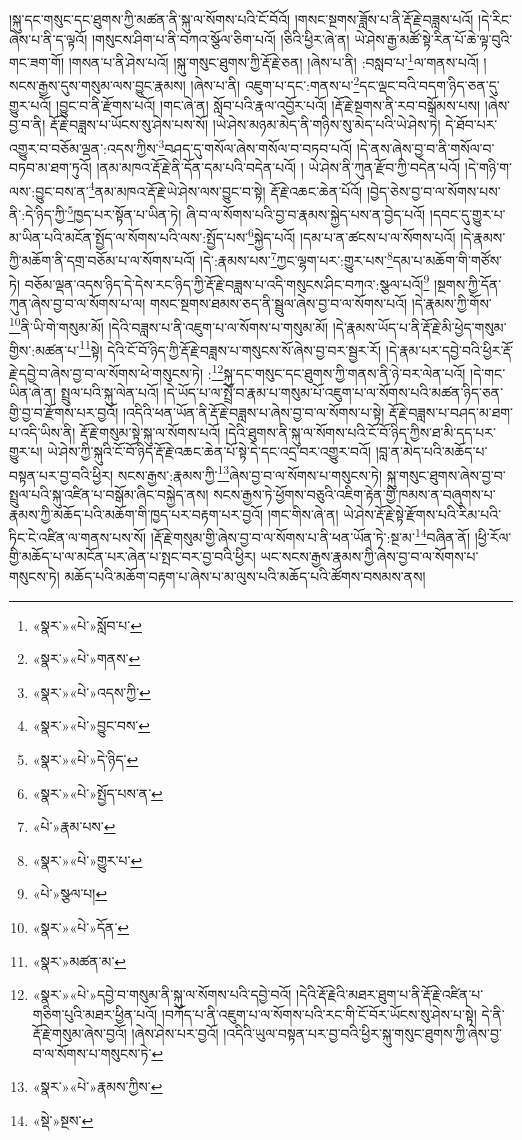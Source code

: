 །སྐུ་དང་གསུང་དང་ཐུགས་ཀྱི་མཚན་ནི་སྐུ་ལ་སོགས་པའི་ངོ་བོའོ། །གསང་སྔགས་ཟློས་པ་ནི་རྡོ་རྗེ་བཟླས་པའོ། །དེ་རིང་ཞེས་པ་ནི་ད་ལྟའོ། །གསུངས་ཤིག་པ་ནི་བཀའ་སྩོལ་ཅིག་པའོ། །ཅིའི་ཕྱིར་ཞེ་ན། ཡེ་ཤེས་རྒྱ་མཚོ་སྟེ་རིན་པོ་ཆེ་ལྟ་བུའི་གང་ཟག་གོ། །གསན་པ་ནི་ཤེས་པའོ། །སྐུ་གསུང་ཐུགས་ཀྱི་རྡོ་རྗེ་ཅན། །ཞེས་པ་ནི། :བསླབ་པ་\footnote{«སྣར་»«པེ་»སློབ་པ་}ལ་གནས་པའོ། །སངས་རྒྱས་དུས་གསུམ་ལས་བྱུང་རྣམས། །ཞེས་པ་ནི། འཇུག་པ་དང་:གནས་པ་\footnote{«སྣར་»«པེ་»གནས་}དང་ལྡང་བའི་བདག་ཉིད་ཅན་དུ་གྱུར་པའོ། །བྱུང་བ་ནི་རྫོགས་པའོ། །གང་ཞེ་ན། སློབ་པའི་རྣལ་འབྱོར་པའོ། །རྡོ་རྗེ་སྔགས་ནི་རབ་བསྒོམས་པས། །ཞེས་བྱ་བ་ནི། རྡོ་རྗེ་བཟླས་པ་ཡོངས་སུ་ཤེས་པས་སོ། །ཡེ་ཤེས་མཉམ་མེད་ནི་གཉིས་སུ་མེད་པའི་ཡེ་ཤེས་ཏེ། དེ་ཐོབ་པར་འགྱུར་བ་བཅོམ་ལྡན་:འདས་ཀྱིས་\footnote{«སྣར་»«པེ་»འདས་ཀྱི་}བཤད་དུ་གསོལ་ཞེས་གསོལ་བ་བཏབ་པའོ། །དེ་ནས་ཞེས་བྱ་བ་ནི་གསོལ་བ་བཏབ་མ་ཐག་ཏུའོ། །ནམ་མཁའ་རྡོ་རྗེ་ནི་དོན་དམ་པའི་བདེན་པའོ། །
ཡེ་ཤེས་ནི་ཀུན་རྫོབ་ཀྱི་བདེན་པའོ། །དེ་གཉི་ག་ལས་:བྱུང་བས་ན་\footnote{«སྣར་»«པེ་»བྱུང་བས་}ནམ་མཁའ་རྡོ་རྗེ་ཡེ་ཤེས་ལས་བྱུང་བ་སྟེ། རྡོ་རྗེ་འཆང་ཆེན་པོའོ། །བྱེད་ཅེས་བྱ་བ་ལ་སོགས་པས་ནི་:དེ་ཉིད་ཀྱི་\footnote{«སྣར་»«པེ་»དེ་ཉིད་}ཁྱད་པར་སྟོན་པ་ཡིན་ཏེ། ཞི་བ་ལ་སོགས་པའི་བྱ་བ་རྣམས་སྐྱེད་པས་ན་བྱེད་པའོ། །དབང་དུ་གྱུར་པ་མ་ཡིན་པའི་མངོན་སྤྱོད་ལ་སོགས་པའི་ལས་:སྤྱོད་པས་\footnote{«སྣར་»«པེ་»སྤྱོད་པས་ན་}སྐྱེད་པའོ། །དམ་པ་ན་ཚངས་པ་ལ་སོགས་པའོ། །དེ་རྣམས་ཀྱི་མཆོག་ནི་དགྲ་བཅོམ་པ་ལ་སོགས་པའོ། །དེ་:རྣམས་པས་\footnote{«པེ་»རྣམ་པས་}ཀྱང་ལྷག་པར་:གྱུར་པས་\footnote{«སྣར་»«པེ་»གྱུར་པ་}དམ་པ་མཆོག་གི་གཙོས་ཏེ། བཅོམ་ལྡན་འདས་ཉིད་དེ་དེས་རང་ཉིད་ཀྱི་རྡོ་རྗེ་བཟླས་པ་འདི་གསུངས་ཤིང་བཀའ་:སྩལ་པའོ།\footnote{«པེ་»སྩལ་པ།} །སྔགས་ཀྱི་དོན་ཀུན་ཞེས་བྱ་བ་ལ་སོགས་པ་ལ། གསང་སྔགས་ཐམས་ཅད་ནི་སྦྲུལ་ཞེས་བྱ་བ་ལ་སོགས་པའོ། །དེ་རྣམས་ཀྱི་གོས་\footnote{«སྣར་»«པེ་»དོན་}ནི་ཡི་གེ་གསུམ་མོ། །དེའི་བཟླས་པ་ནི་འཇུག་པ་ལ་སོགས་པ་གསུམ་མོ། །དེ་རྣམས་ཡོད་པ་ནི་རྡོ་རྗེ་མི་ཕྱེད་གསུམ་གྱིས་:མཚན་པ་\footnote{«སྣར་»མཚན་མ་}སྟེ། དེའི་ངོ་བོ་ཉིད་ཀྱི་རྡོ་རྗེ་བཟླས་པ་གསུངས་སོ་ཞེས་བྱ་བར་སྦྱར་རོ། །དེ་རྣམ་པར་དབྱེ་བའི་ཕྱིར་རྡོ་རྗེ་དབྱེ་བ་ཞེས་བྱ་བ་ལ་སོགས་ཕེ་གསུངས་ཏེ། :\footnote{«སྣར་»«པེ་»དབྱེ་བ་གསུམ་ནི་སྐུ་ལ་སོགས་པའི་དབྱེ་བའོ། །དེའི་རྡོ་རྗེའི་མཐར་ཐུག་པ་ནི་རྡོ་རྗེ་འཛིན་པ་གཅིག་པུའི་མཐར་ཕྱིན་པའོ། །བཀོད་པ་ནི་འཇུག་པ་ལ་སོགས་པའི་རང་གི་ངོ་བོར་ཡོངས་སུ་ཤེས་པ་སྟེ། དེ་ནི་རྡོ་རྗེ་གསུམ་ཞེས་བྱའོ། །ཞེས་ཤེས་པར་བྱའོ། །འདིའི་ཡུལ་བསྟན་པར་བྱ་བའི་ཕྱིར་སྐུ་གསུང་ཐུགས་ཀྱི་ཞེས་བྱ་བ་ལ་སོགས་པ་གསུངས་ཏེ་}སྐུ་དང་གསུང་དང་ཐུགས་ཀྱི་གནས་ནི་ཉེ་བར་ལེན་པའོ། །དེ་གང་ཡིན་ཞེ་ན། སྤྲུལ་པའི་སྐུ་ལེན་པའོ། །དེ་ཡོད་པ་ལ་སྤྲོ་བ་རྣམ་པ་གསུམ་པོ་འཇུག་པ་ལ་སོགས་པའི་མཚན་ཉིད་ཅན་གྱི་བྱ་བ་རྫོགས་པར་བྱའོ། །འདིའི་ཕན་ཡོན་ནི་རྡོ་རྗེ་བཟླས་པ་ཞེས་བྱ་བ་ལ་སོགས་པ་སྟེ། རྡོ་རྗེ་བཟླས་པ་བཤད་མ་ཐག་པ་འདི་ཡིས་ནི། རྡོ་རྗེ་གསུམ་སྟེ་སྐུ་ལ་སོགས་པའོ། །དེའི་ཐུགས་ནི་སྐུ་ལ་སོགས་པའི་ངོ་བོ་ཉིད་ཀྱིས་ཐ་མི་དད་པར་གྱུར་པ། ཡེ་ཤེས་ཀྱི་སྐུའི་ངོ་བོ་ཉིད་རྡོ་རྗེ་འཆང་ཆེན་པོ་སྟེ་དེ་དང་འདྲ་བར་འགྱུར་བའོ། །བླ་ན་མེད་པའི་མཆོད་པ་བསྟན་པར་བྱ་བའི་ཕྱིར། སངས་རྒྱས་:རྣམས་ཀྱི་\footnote{«སྣར་»«པེ་»རྣམས་ཀྱིས་}ཞེས་བྱ་བ་ལ་སོགས་པ་གསུངས་ཏེ། སྐུ་གསུང་ཐུགས་ཞེས་བྱ་བ་སྤྲུལ་པའི་སྐུ་འཛིན་པ་བསྒོམ་ཞིང་བསྐྱེད་ནས། སངས་རྒྱས་ཏེ་ཕྱོགས་བཅུའི་འཇིག་རྟེན་གྱི་ཁམས་ན་བཞུགས་པ་རྣམས་ཀྱི་མཆོད་པའི་མཆོག་གི་ཁྱད་པར་བརྟག་པར་བྱའོ། །གང་གིས་ཞེ་ན། ཡེ་ཤེས་རྡོ་རྗེ་སྟེ་རྫོགས་པའི་རིམ་པའི་ཏིང་ངེ་འཛིན་ལ་གནས་པས་སོ། །རྡོ་རྗེ་གསུམ་གྱི་ཞེས་བྱ་བ་ལ་སོགས་པ་ནི་ཕན་ཡོན་ཏེ་:སྔ་མ་\footnote{«སྡེ་»སྔས་}བཞིན་ནོ། །ཕྱི་རོལ་གྱི་མཆོད་པ་ལ་མངོན་པར་ཞེན་པ་སྤང་བར་བྱ་བའི་ཕྱིར། ཡང་སངས་རྒྱས་རྣམས་ཀྱི་ཞེས་བྱ་བ་ལ་སོགས་པ་གསུངས་ཏེ། མཆོད་པའི་མཆོག་བརྟག་པ་ཞེས་པ་མ་ལུས་པའི་མཆོད་པའི་ཚོགས་བསམས་ནས། 